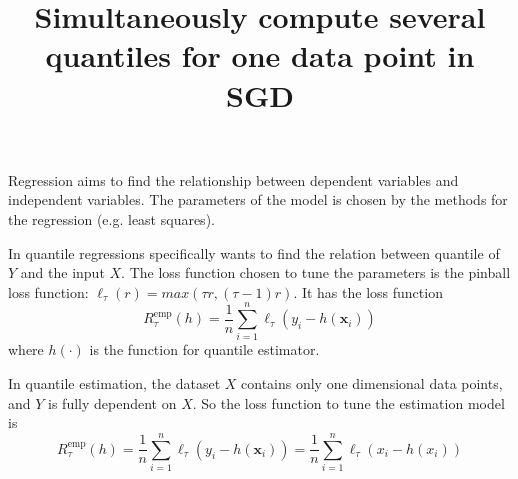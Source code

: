\documentclass[12pt]{article}
\title{Simultaneously compute several quantiles for one data point in SGD}
\date{\vspace{-5ex}}
\begin{document}
\maketitle

Regression aims to find the relationship between dependent variables and independent variables. The parameters of the model is chosen by the methods for the regression (e.g. least squares).

In quantile regressions specifically wants to find the relation between quantile of $Y$ and the input $X$. The loss function chosen to tune the parameters is the pinball loss function: $\ell_{\tau}(r) = max(\tau r, (\tau - 1)r)$. It has the loss function 
$$
R_{\tau}^{\mathrm{emp}}(h)=\frac{1}{n} \sum_{i=1}^{n} \ell_{\tau}\left(y_{i}-h\left(\mathbf{x}_{i}\right)\right)
$$
where $h(\cdot)$ is the function for quantile estimator.

In quantile estimation, the dataset $X$ contains only one dimensional data points, and $Y$ is fully dependent on $X$. So the loss function to tune the estimation model is
$$
R_{\tau}^{\mathrm{emp}}(h)=\frac{1}{n} \sum_{i=1}^{n} \ell_{\tau}\left(y_{i}-h\left(\mathbf{x}_{i}\right)\right)
= \frac{1}{n} \sum_{i=1}^{n} \ell_{\tau}\left(x_{i}-h\left({x}_{i}\right)\right)
$$
\end{document}
